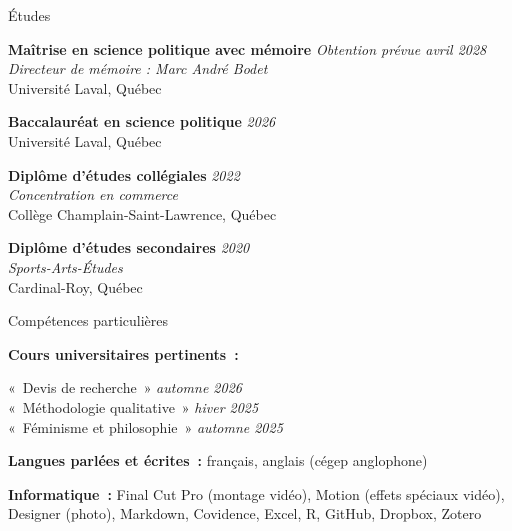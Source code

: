 \documentclass{resume} %
\begin{document}

\begin{rSection}{Études}

{\bf Maîtrise en science politique avec mémoire} \hfill {\em Obtention prévue avril 2028}
\\ {\em Directeur de mémoire : Marc André Bodet}
\\ Université Laval, Québec

{\bf Baccalauréat en science politique} \hfill {\em 2026}
\\ Université Laval, Québec

{\bf Diplôme d'études collégiales} \hfill {\em 2022}
\\ {\em Concentration en commerce}
\\ Collège Champlain-Saint-Lawrence, Québec

{\bf Diplôme d'études secondaires} \hfill {\em 2020}
\\ {\em Sports-Arts-Études}
\\ Cardinal-Roy, Québec

\end{rSection}


\begin{rSection}{Compétences particulières}

{\bf Cours universitaires pertinents~:}

«~Devis de recherche~» \hfill {\em automne 2026} \\
«~Méthodologie qualitative~» \hfill {\em hiver 2025} \\
«~Féminisme et philosophie~» \hfill {\em automne 2025}

{\bf Langues parlées et écrites~:} français, anglais (cégep anglophone)

{\bf Informatique~:} Final Cut Pro (montage vidéo), Motion (effets spéciaux vidéo), Designer (photo), Markdown, Covidence, Excel, R, GitHub, Dropbox, Zotero

\end{rSection}

\end{document}
